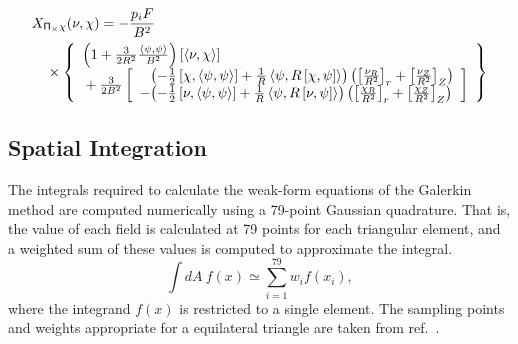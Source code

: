 \documentclass[letterpaper]{book}
\newcommand{\tensor}[1]{\mathsf{#1}}
\renewcommand{\P}{\tensor{\Pi}}
\newcommand{\pb}[2]{\left[#1,#2\right]}
\newcommand{\ip}[2]{\left\langle  #1,#2\right\rangle}
\newcommand{\funcsa}[2]{\left[\left\langle #1,#2 \right\rangle\right]}
\begin{document}
\begin{eqnarray*}
  & \lefteqn{X_{\P_\times \chi}(\nu, \chi) = -\frac{p_i F}{B^2}} &
  \\ && \mbox{} \times 
  \left\{ \begin{array}{l}
    \left(1 + \frac{3}{2 R^2} \frac{\ip{\psi}{\psi}}{B^2} \right)
    \funcsa{\nu}{\chi}
    \\ \mbox{} + \frac{3}{2 B^2} \left[ \begin{array}{r@{}l}
      & \left(- \frac{1}{2} \pb{\chi}{\ip{\psi}{\psi}}
	      + \frac{1}{R} \ip{\psi}{R\pb{\chi}{\psi}} 
             \right)
	\left( \left[ \frac{\nu_R}{R^2} \right]_r
	     + \left[ \frac{\nu_Z}{R^2} \right]_Z \right)
    \\ \mbox{}
     - & \left(- \frac{1}{2} \pb{\nu}{\ip{\psi}{\psi}}
               + \frac{1}{R} \ip{\psi}{R\pb{\nu}{\psi}} 
              \right)
         \left( \left[ \frac{\chi_R}{R^2} \right]_r
	      + \left[ \frac{\chi_Z}{R^2} \right]_Z \right)
      \end{array} \right]
  \end{array} \right\}
\end{eqnarray*}

\subsection{Spatial Integration}

The integrals required to calculate the weak-form equations of the
Galerkin method are computed numerically using a 79-point Gaussian
quadrature.  That is, the value of each field is calculated at 79
points for each triangular element, and a weighted sum of these values
is computed to approximate the integral.
\[
  \int dA\ f(x) \simeq \sum_{i=1}^{79} w_i f(x_i),
\]
where the integrand $f(x)$ is restricted to a single element.  The
sampling points and weights appropriate for a equilateral triangle are
taken from ref.~\cite{Dunavant85}.
\end{document}
